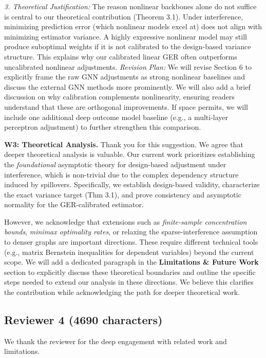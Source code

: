 \documentclass{article}
\theoremstyle{plain}
\theoremstyle{definition}
\theoremstyle{remark}
\begin{document}
\textit{3. Theoretical Justification:} The reason nonlinear backbones alone do not suffice is central to our theoretical contribution (Theorem 3.1). Under interference, minimizing prediction error (which nonlinear models excel at) does not align with minimizing estimator variance. A highly expressive nonlinear model may still produce suboptimal weights if it is not calibrated to the design-based variance structure. This explains why our calibrated linear GER often outperforms uncalibrated nonlinear adjustments.
\textit{Revision Plan:} We will revise Section 6 to explicitly frame the raw GNN adjustments as strong nonlinear baselines and discuss the external GNN methods more prominently. We will also add a brief discussion on why calibration complements nonlinearity, ensuring readers understand that these are orthogonal improvements. If space permits, we will include one additional deep outcome model baseline (e.g., a multi-layer perceptron adjustment) to further strengthen this comparison.
\vspace{0.5em}


\noindent\textbf{W3: Theoretical Analysis.}
Thank you for this suggestion. We agree that deeper theoretical analysis is valuable. Our current work prioritizes establishing the \emph{foundational} asymptotic theory for design-based adjustment under interference, which is non-trivial due to the complex dependency structure induced by spillovers. Specifically, we establish design-based validity, characterize the exact variance target (Thm 3.1), and prove consistency and asymptotic normality for the GER-calibrated estimator.

However, we acknowledge that extensions such as \emph{finite-sample concentration bounds}, \emph{minimax optimality rates}, or relaxing the sparse-interference assumption to denser graphs are important directions. These require different technical tools (e.g., matrix Bernstein inequalities for dependent variables) beyond the current scope. We will add a dedicated paragraph in the \textbf{Limitations \& Future Work} section to explicitly discuss these theoretical boundaries and outline the specific steps needed to extend our analysis in these directions. We believe this clarifies the contribution while acknowledging the path for deeper theoretical work.
\subsection{Reviewer 4 (4690 characters)}
 We thank the reviewer for the deep engagement with related work and limitations.
\end{document}
